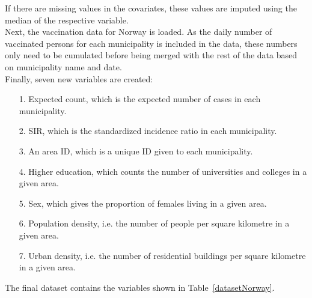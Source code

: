 If there are missing values in the covariates, these values are imputed using the median of the respective variable. \\
Next, the vaccination data for Norway is loaded. As the daily number of vaccinated persons for each municipality is included in the data, these numbers only need to be cumulated before being merged with the rest of the data based on municipality name and date. \\
Finally, seven new variables are created:
\begin{itemize}
    \item[1.] Expected count, which is the expected number of cases in each municipality.
    \item[2.] SIR, which is the standardized incidence ratio in each municipality.
    \item[3.] An area ID, which is a unique ID given to each municipality.
    \item[4.] Higher education, which counts the number of universities and colleges in a given area.
    \item[5.] Sex, which gives the proportion of females living in a given area.
    \item[6.] Population density, i.e. the number of people per square kilometre in a given area.
    \item[7.] Urban density, i.e. the number of residential buildings per square kilometre in a given area.
\end{itemize}
The final dataset contains the variables shown in Table~\ref{datasetNorway}.
